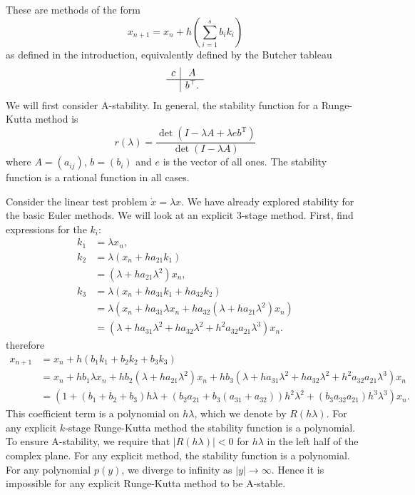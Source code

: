 \documentclass{report}
\theoremstyle{exampstyle} \newtheorem{example}[theorem]{Example}
\theoremstyle{exampstyle} \newtheorem{remark}[theorem]{Remark}
\theoremstyle{exampstyle} \newtheorem{definition}[theorem]{Definition}
\theoremstyle{exampstyle} \newtheorem{lemma}[theorem]{Lemma}
\theoremstyle{exampstyle} \newtheorem{proposition}[theorem]{Proposition}
\begin{document}
These are methods of the form
\begin{equation*}
	x_{n+1} = x_n + h \left( \sum_{i = 1}^{s} b_i k_i \right)
\end{equation*}
as defined in the introduction, equivalently defined by the Butcher tableau
\begin{equation*}
	\begin{array}{c|ccc}
		c &A \\
		\hline
		&b^\top .
	\end{array}
\end{equation*}
We will first consider A-stability.
In general, the stability function for a Runge-Kutta method \cite{iserles2009rk} is
\begin{equation*}
	r(\lambda) = \frac{\det(I - \lambda A + \lambda eb^\mathrm{T})}{\det(I - \lambda A)}
\end{equation*}
where $A = (a_{ij})$, $b = (b_i)$ and $e$ is the vector of all ones.
The stability function is a rational function in all cases.

Consider the linear test problem $\dot{x} = \lambda x$.
We have already explored stability for the basic Euler methods.
We will look at an explicit 3-stage method.
First, find expressions for the $k_i$:
\begin{align*}
	k_1 &= \lambda x_n, \\
	k_2 &= \lambda\left( x_n + h a_{21}k_1 \right) \\
	&= \left( \lambda + h a_{21}\lambda^2 \right)x_n, \\
	k_3 &= \lambda \left( x_n + h a_{31}k_1 + h a_{32}k_2 \right) \\
	&= \lambda \left( x_n + h a_{31} \lambda x_n + h a_{32}\left( \lambda + h a_{21} \lambda^2 \right) x_n \right) \\
	&= \left( \lambda + h a_{31}\lambda^2 + h a_{32}\lambda^2 + h^2 a_{32}a_{21}\lambda^3 \right) x_n.
\end{align*}
therefore
\begin{align*}
	x_{n+1} &= x_n + h \left( b_1 k_1 + b_2 k_2 + b_3 k_3 \right) \\
	&= x_n + h b_1 \lambda x_n + h b_2 \left(\lambda + h a_{21} \lambda^2\right)x_n + hb_3 \left( \lambda + h a_{31} \lambda^2 + h a_{32} \lambda ^2 + h^2 a_{32} a_{21} \lambda^3\right)x_n \\
	&= \left(
		1 + \left( b_1 + b_2 + b_3 \right) h\lambda + \left(
			b_2 a_{21} + b_3 (a_{31} + a_{32})
		\right)h^2\lambda^2 + \left(
			b_3 a_{32} a_{21}
		\right)h^3\lambda^3
	\right)x_n.
\end{align*}
This coefficient term is a polynomial on $h\lambda$, which we denote by $R(h\lambda)$.
For any explicit $k$-stage Runge-Kutta method the stability function is a polynomial.
To ensure A-stability, we require that $|R(h\lambda)| < 0$ for $h \lambda$ in the left half of the complex plane.
For any explicit method, the stability function is a polynomial.
For any polynomial $p(y)$, we diverge to infinity as $|y| \rightarrow \infty$.
Hence it is impossible for any explicit Runge-Kutta method to be A-stable.
\end{document}
